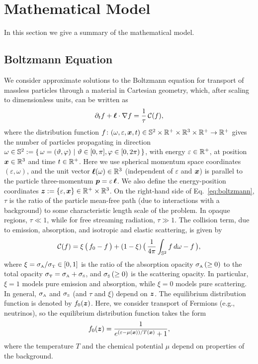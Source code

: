 \section{Mathematical Model}

In this section we give a summary of the mathematical model.  

\subsection{Boltzmann Equation}

We consider approximate solutions to the Boltzmann equation for transport of massless particles through a material in Cartesian geometry, which, after scaling to dimensionless units, can be written as
\begin{equation}
  \pd{f}{t}+\vect{\ell}\cdot\nabla f
  =\f{1}{\tau}\,\cC(f),
  \label{eq:boltzmann}
\end{equation}
where the distribution function $f\colon(\omega,\varepsilon,\boldsymbol{x},t)\in\mathbb{S}^{2}\times\mathbb{R}^{+}\times\mathbb{R}^{3}\times\mathbb{R}^{+}\to\mathbb{R}^{+}$ gives the number of particles propagating in direction $\omega\in\mathbb{S}^{2}:=\{\,\omega=(\vartheta,\varphi)~|~\vartheta\in[0,\pi],\varphi\in[0,2\pi)\,\}$, with energy $\varepsilon\in\mathbb{R}^{+}$, at position $\boldsymbol{x}\in\mathbb{R}^{3}$ and time $t\in\mathbb{R}^{+}$.  
Here we use spherical momentum space coordinates $(\varepsilon,\omega)$, and the unit vector $\boldsymbol{\ell}(\omega)\in\mathbb{R}^{3}$ (independent of $\varepsilon$ and $\boldsymbol{x}$) is parallel to the particle three-momentum $\boldsymbol{p}=\varepsilon\,\boldsymbol{\ell}$.  
We also define the energy-position coordinates $\boldsymbol{z}:=\{\varepsilon,\boldsymbol{x}\}\in\mathbb{R}^{+}\times\mathbb{R}^{3}$.  
On the right-hand side of Eq.~\eqref{eq:boltzmann}, $\tau$ is the ratio of the particle mean-free path (due to interactions with a background) to some characteristic length scale of the problem.  
In opaque regions, $\tau\ll1$, while for free streaming radiation, $\tau\gg1$.  
The collision term, due to emission, absorption, and isotropic and elastic scattering, is given by
\begin{equation}
  \cC(f)=\xi\,\big(\,f_{0}-f\,\big)
  +(1-\xi)\,\big(\,\f{1}{4\pi}\int_{\bbS^{2}}f\,d\omega-f\,\big),
  \label{eq:collisionTerm}
\end{equation}
where $\xi=\sigma_{\mbox{\tiny A}}/\sigma_{\mbox{\tiny T}}\in[0,1]$ is the ratio of the absorption opacity $\sigma_{\mbox{\tiny A}}\,(\ge0)$ to the total opacity $\sigma_{\mbox{\tiny T}}=\sigma_{\mbox{\tiny A}}+\sigma_{\mbox{\tiny S}}$, and $\sigma_{\mbox{\tiny S}}\,(\ge0)$ is the scattering opacity.  
In particular, $\xi=1$ models pure emission and absorption, while $\xi=0$ models pure scattering.  
In general, $\sigma_{\mbox{\tiny A}}$ and $\sigma_{\mbox{\tiny S}}$ (and $\tau$ and $\xi$) depend on $\boldsymbol{z}$.  
The equilibrium distribution function is denoted by $f_{0}(\boldsymbol{z})$.  
Here, we consider transport of Fermions (e.g., neutrinos), so the equilibrium distribution function takes the form
\begin{equation}
  f_{0}(\vect{z})=\f{1}{e^{(\varepsilon-\mu(\vect{x}))/T(\vect{x})}+1},  
  \label{eq:fermiDirac}
\end{equation}
where the temperature $T$ and the chemical potential $\mu$ depend on properties of the background.  

